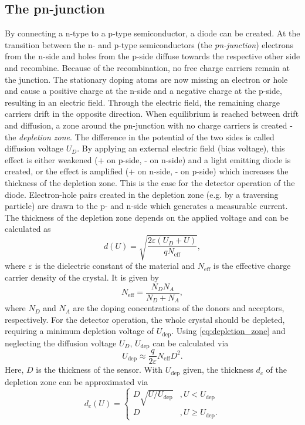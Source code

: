 \subsection{The pn-junction}
By connecting a n-type to a p-type semiconductor, a diode can be created. At the transition between the n- and p-type semiconductors (the \textit{pn-junction}) electrons from the 
n-side and holes from the p-side diffuse towards the respective other side and recombine. Because of the recombination, no free charge carriers remain at the junction.
The stationary doping atoms are now missing an electron or hole and cause a positive charge at the n-side and a negative charge at the p-side, resulting in an electric field.
Through the electric field, the remaining charge carriers drift in the opposite direction. When equilibrium is reached between drift and diffusion, a zone around the pn-junction 
with no charge carriers is created - the \textit{depletion zone}. The difference in the potential of the two sides is called diffusion voltage $U_D$.
By applying an external electric field (bias voltage), this effect is either weakened (+ on p-side, - on n-side) and a light emitting diode is created, or the effect is amplified 
(+ on n-side, - on p-side) which increases the thickness of the depletion zone. This is the case for the detector operation of the diode. Electron-hole pairs created in the
depletion zone (e.g. by a traversing particle) are drawn to the p- and n-side which generates a measurable current.
The thickness of the depletion zone depends on the applied voltage and can be calculated as 
\begin{equation}
    d(U) = \sqrt{\frac{2\varepsilon (U_D + U)}{qN_\text{eff}}},
    \label{eq:depletion_zone}
\end{equation}
where $\varepsilon$ is the dielectric constant of the material and $N_\text{eff}$ is the effective charge carrier density of the crystal.
It is given by 
\begin{equation}
    N_\text{eff} = \frac{N_D N_A}{N_D + N_A},
    \label{eq:N_eff}
\end{equation}
where $N_D$ and $N_A$ are the doping concentrations of the donors and acceptors, respectively.
For the detector operation, the whole crystal should be depleted, requiring a minimum depletion voltage of $U_\text{dep}$. Using \autoref{eq:depletion_zone} and neglecting 
the diffusion voltage $U_D$, $U_\text{dep}$ can be calculated via
\begin{equation}
    U_\text{dep} \approx \frac{q}{2\varepsilon} N_\text{eff} D^2.
    \label{eq:U_dep}
\end{equation}
Here, $D$ is the thickness of the sensor.
With $U_\text{dep}$ given, the thickness $d_c$ of the depletion zone can be approximated via 
\begin{equation}
    d_c(U) = 
    \begin{cases}
        D \sqrt{U/U_\text{dep}} & , U<U_\text{dep} \\
        D & , U \geq U_\text{dep}.
    \end{cases}
\end{equation}

